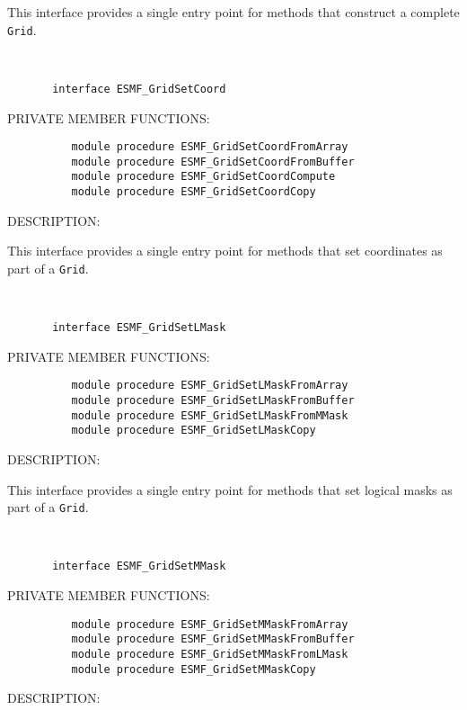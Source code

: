        This interface provides a single entry point for methods that construct a
       complete {\tt Grid}.
   
 
\mbox{}\hrulefill\ 
 

\begin{verbatim}       interface ESMF_GridSetCoord
 \end{verbatim}{\sf PRIVATE MEMBER FUNCTIONS:}
\begin{verbatim}          module procedure ESMF_GridSetCoordFromArray
          module procedure ESMF_GridSetCoordFromBuffer
          module procedure ESMF_GridSetCoordCompute
          module procedure ESMF_GridSetCoordCopy
 \end{verbatim}
{\sf DESCRIPTION:\\ }


       This interface provides a single entry point for methods that set
       coordinates as part of a {\tt Grid}.
   
 
\mbox{}\hrulefill\ 
 

\begin{verbatim}       interface ESMF_GridSetLMask
 \end{verbatim}{\sf PRIVATE MEMBER FUNCTIONS:}
\begin{verbatim}          module procedure ESMF_GridSetLMaskFromArray
          module procedure ESMF_GridSetLMaskFromBuffer
          module procedure ESMF_GridSetLMaskFromMMask
          module procedure ESMF_GridSetLMaskCopy
 \end{verbatim}
{\sf DESCRIPTION:\\ }


       This interface provides a single entry point for methods that set
       logical masks as part of a {\tt Grid}.
   
 
\mbox{}\hrulefill\ 
 

\begin{verbatim}       interface ESMF_GridSetMMask
 \end{verbatim}{\sf PRIVATE MEMBER FUNCTIONS:}
\begin{verbatim}          module procedure ESMF_GridSetMMaskFromArray
          module procedure ESMF_GridSetMMaskFromBuffer
          module procedure ESMF_GridSetMMaskFromLMask
          module procedure ESMF_GridSetMMaskCopy
 \end{verbatim}
{\sf DESCRIPTION:\\ }


